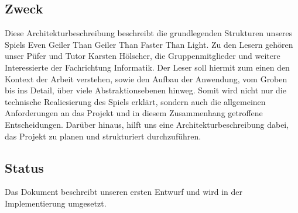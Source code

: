 \documentclass[fontsize=12pt,paper=a4,twoside]{scrartcl}
\begin{document}
\subsection{Zweck}

Diese Architekturbeschreibung beschreibt die grundlegenden Strukturen unseres 
Spiels \glqq Even Geiler Than Geiler Than Faster Than Light\grqq{}. 
Zu den Lesern gehören unser Püfer und Tutor Karsten Hölscher, die 
Gruppenmitglieder und weitere Interessierte der Fachrichtung Informatik.
Der Leser soll  hiermit zum einen den Kontext der Arbeit verstehen, 
sowie den Aufbau der Anwendung, vom Groben bis ins Detail, über viele 
Abstraktionsebenen hinweg. Somit wird nicht nur die technische Realiesierung 
des Spiels erklärt, sondern auch die allgemeinen Anforderungen an das Projekt  
und in diesem Zusammenhang  getroffene Entscheidungen.
Darüber hinaus, hilft uns eine Architekturbeschreibung dabei, 
das Projekt zu planen und strukturiert durchzuführen.


\subsection{Status}
Das Dokument beschreibt unseren ersten Entwurf und wird in der Implementierung umgesetzt.
\end{document}
